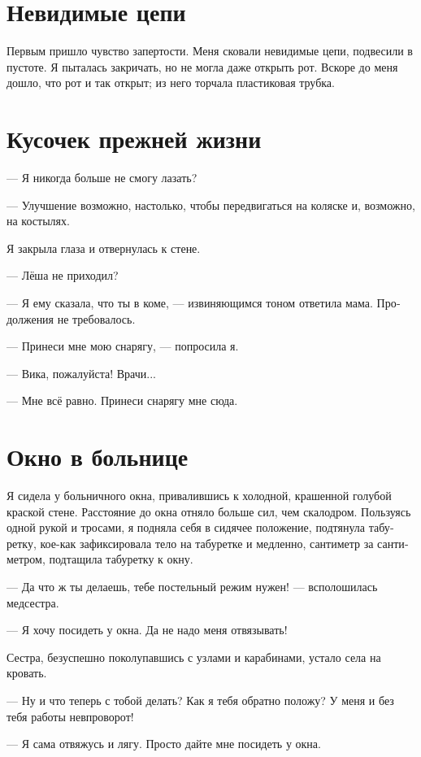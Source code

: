 \documentclass[a4paper,10pt,fleqn]{book}\usepackage{polyglossia}\setdefaultlanguage[babelshorthands=true]{russian}\setotherlanguage{english}\defaultfontfeatures{Ligatures=TeX,Mapping=tex-text}\usepackage{xcolor}\newcommand{\ml}[3]{#2}
\begin{document}
\section{Невидимые цепи}

Первым пришло чувство запертости.
Меня сковали невидимые цепи, подвесили в пустоте.
Я пыталась закричать, но не могла даже открыть рот.
Вскоре до меня дошло, что рот и так открыт;
из него торчала пластиковая трубка.

\section{Кусочек прежней жизни}

--- Я никогда больше не смогу лазать?

--- Улучшение возможно, настолько, чтобы передвигаться на коляске и, возможно, на костылях.

Я закрыла глаза и отвернулась к стене.

--- Лёша не приходил?

--- Я ему сказала, что ты в коме, --- извиняющимся тоном ответила мама.
Продолжения не требовалось.

--- Принеси мне мою снарягу, --- попросила я.

--- Вика, пожалуйста!
Врачи...

--- Мне всё равно.
Принеси снарягу мне сюда.

\section{Окно в больнице}

Я сидела у больничного окна, привалившись к холодной, крашенной голубой краской стене.
Расстояние до окна отняло больше сил, чем скалодром.
Пользуясь одной рукой и тросами, я подняла себя в сидячее положение, подтянула табуретку, кое-как зафиксировала тело на табуретке и медленно, сантиметр за сантиметром, подтащила табуретку к окну.

--- Да что ж ты делаешь, тебе постельный режим нужен! --- всполошилась медсестра.

--- Я хочу посидеть у окна.
Да не надо меня отвязывать!

Сестра, безуспешно поколупавшись с узлами и карабинами, устало села на кровать.

--- Ну и что теперь с тобой делать?
Как я тебя обратно положу?
У меня и без тебя работы невпроворот!

--- Я сама отвяжусь и лягу.
Просто дайте мне посидеть у окна.
\end{document}
